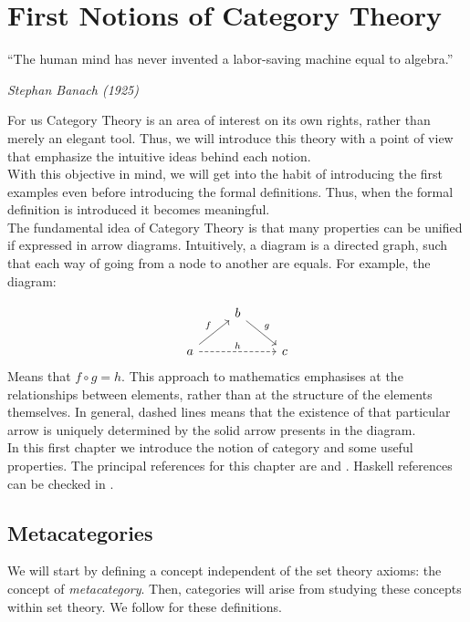 



\chapter{First Notions of Category Theory}

\epigraph{“The human mind has never invented a labor-saving machine equal to algebra.” }{\textit{Stephan Banach (1925)}}

For us Category Theory is an area of interest on its own rights, rather than merely an elegant tool. Thus, we will introduce this theory with a point of view that emphasize the intuitive ideas behind each notion.\\

 With this objective in mind, we will get into the habit of introducing the first examples even before introducing the formal definitions. Thus, when the formal definition is introduced it becomes meaningful.\\

The fundamental idea of Category Theory is that many properties can be unified if expressed in arrow diagrams. Intuitively, a diagram is a directed graph, such that each way of going from a node to another are equals. For example, the diagram:

\[
  \begin{tikzcd}
    & b \arrow[rd, "g"]& \\
    a\arrow[ru, "f"] \arrow[rr, "h", dashed] && c
  \end{tikzcd}
\]
Means that $f\circ g = h$. This approach to mathematics emphasises  at the relationships between elements, rather than at the structure of the elements themselves. In general, dashed lines means that the existence of that particular arrow is uniquely determined by the solid arrow presents in the diagram.\\

In this first chapter we introduce the notion of category and some useful properties. The principal references for this chapter are \cite{mac2013categories} and \cite{riehl2017category}. Haskell references can be checked in \cite{milewski2018category}.

\section{Metacategories}
We will start by defining a concept independent of the set theory axioms: the concept of \emph{metacategory}. Then, categories will arise from studying these concepts within set theory. We follow  \cite{mac2013categories} for these definitions.\\


